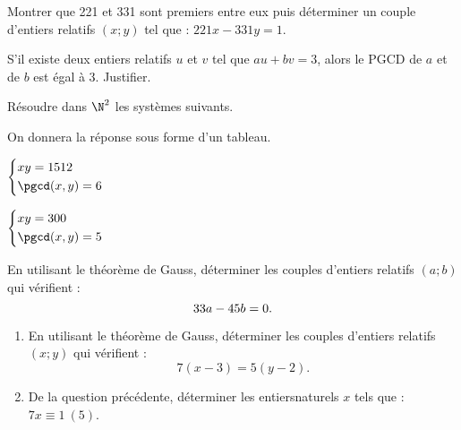 \documentclass{cornouaille}
\begin{document}
\begin{colonne*exercice}
\begin{exercice}
  Montrer que 221 et 331 sont premiers entre eux puis déterminer un
  couple d'entiers relatifs $(x;y)$ tel que : $221x - 331y = 1$.
\end{exercice}

\begin{exercice}
  S’il existe deux entiers relatifs $u$ et $v$ tel que $au + bv = 3$,
  alors le PGCD de $a$ et de $b$ est égal à 3. Justifier.
\end{exercice}

\begin{exercice}
  Résoudre dans $\N^2$ les systèmes suivants. 

  On donnera la réponse sous forme d'un tableau.
\begin{colenumerate}{2}
\item $\left\{\begin{aligned}
					&xy=1512\\
					&\pgcd(x,y)=6\end{aligned}\right.$
\item $\left\{\begin{aligned}
					&xy=300\\
					&\pgcd(x,y)=5\end{aligned}\right.$
\end{colenumerate}
\end{exercice}

\columnbreak


\begin{exercice}
En utilisant le théorème de Gauss, déterminer les couples d’entiers relatifs $(a;b)$ qui vérifient :
$$33a - 45b = 0.\vspace{-20pt}$$
\end{exercice}

\begin{exercice}
\begin{enumerate}
\item En utilisant le théorème de Gauss, déterminer les couples d’entiers relatifs $(x;y)$ qui vérifient :
$$7(x-3)=5(y-2).$$
\item De la question précédente, déterminer les entiers\linebreak naturels $x$ tels que : $7x\equiv1~(5)$.
\end{enumerate}
\end{exercice}


\end{colonne*exercice}
\end{document}
